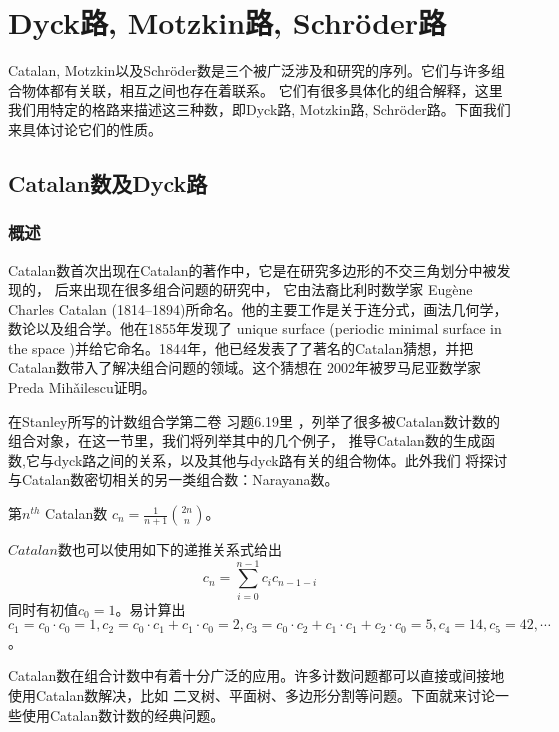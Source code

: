 
\chapter{Dyck路, Motzkin路, Schr\"{o}der路}

Catalan, Motzkin以及Schr\"{o}der数是三个被广泛涉及和研究的序列。它们与许多组合物体都有关联，相互之间也存在着联系。
它们有很多具体化的组合解释，这里我们用特定的格路来描述这三种数，即Dyck路, Motzkin路, Schr\"{o}der路。下面我们来具体讨论它们的性质。
\section{Catalan数及Dyck路}
\subsection{概述}
Catalan数首次出现在Catalan的著作中，它是在研究多边形的不交三角划分中被发现的，
后来出现在很多组合问题的研究中，
它由法裔比利时数学家 Eug\`{e}ne Charles Catalan (1814–1894)所命名。他的主要工作是关于连分式，画法几何学，数论以及组合学。他在1855年发现了
unique surface (periodic minimal surface in the space )并给它命名。1844年，他已经发表了了著名的Catalan猜想，并把Catalan数带入了解决组合问题的领域。这个猜想在
2002年被罗马尼亚数学家Preda Mih\v{a}ilescu证明。

在Stanley所写的计数组合学第二卷\cite{Stanley1999}
习题6.19里
，列举了很多被Catalan数计数的组合对象，在这一节里，我们将列举其中的几个例子，
推导Catalan数的生成函数,它与dyck路之间的关系，以及其他与dyck路有关的组合物体。此外我们
将探讨与Catalan数密切相关的另一类组合数：Narayana数。


\begin{defi}
第$n^{th}$ Catalan数 $c_n=\displaystyle{\frac{1}{n+1}{2n\choose n}}$。
\end{defi}
$Catalan$数也可以使用如下的递推关系式给出
\begin{equation}
\label{cnrecurrence}
c_n=\sum\limits_{i=0}^{n-1}c_ic_{n-1-i}
\end{equation}
同时有初值$c_0=1$。易计算出$c_1=c_0\cdot c_0=1,c_2=c_0\cdot c_1+c_1\cdot c_0=2,c_3=c_0\cdot c_2+c_1\cdot c_1+c_2\cdot c_0=5,c_4=14,c_5=42,\cdots$。

Catalan数在组合计数中有着十分广泛的应用。许多计数问题都可以直接或间接地使用Catalan数解决，比如
二叉树、平面树、多边形分割等问题。下面就来讨论一些使用Catalan数计数的经典问题。
